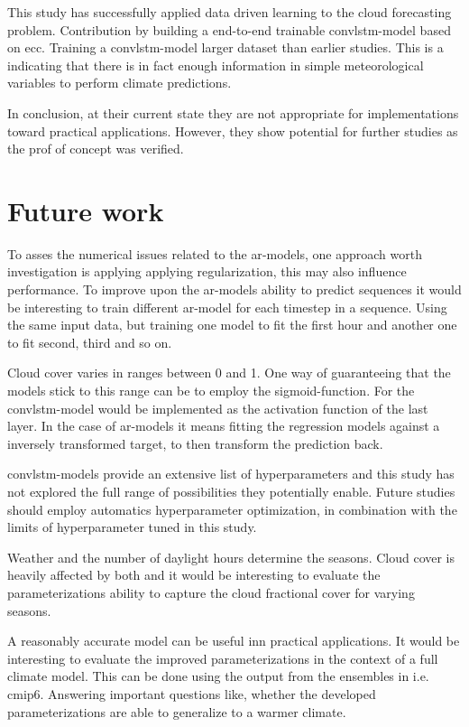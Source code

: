 This study has successfully applied data driven learning to the cloud forecasting problem. Contribution by building a end-to-end trainable \acrshort{convlstm}-model based on \acrshort{ecc}. Training a \acrshort{convlstm}-model larger dataset than earlier studies. This is a indicating that there is in fact enough information in simple meteorological variables to perform climate predictions. 

In conclusion, at their current state they are not appropriate for implementations toward practical applications. However, they show potential for further studies as the prof of concept was verified.

\section{Future work}
To asses the numerical issues related to the \acrshort{ar}-models, one approach worth investigation is applying applying regularization, this may also influence performance. To improve upon the \acrshort{ar}-models ability to predict sequences it would be interesting to train different \acrshort{ar}-model for each timestep in a sequence. Using the same input data, but training one model to fit the first hour and another one to fit second, third and so on.

Cloud cover varies in ranges between 0 and 1. One way of guaranteeing that the models stick to this range can be to employ the sigmoid-function. For the \acrshort{convlstm}-model would be implemented as the activation function of the last layer. In the case of \acrshort{ar}-models it means fitting the regression models against a inversely transformed target, to then transform the prediction back.

\acrshort{convlstm}-models provide an extensive list of hyperparameters and this study has not explored the full range of possibilities they potentially enable. Future studies should employ automatics hyperparameter optimization, in combination with the limits of hyperparameter tuned in this study.  

Weather and the number of daylight hours determine the seasons. Cloud cover is heavily affected by both and it would be interesting to evaluate the parameterizations ability to capture the cloud fractional cover for varying seasons. 

A reasonably accurate model can be useful inn practical applications. It would be interesting to evaluate the improved parameterizations in the context of a full climate model. This can be done using the output from the ensembles in i.e. \acrshort{cmip6}. Answering important questions like, whether the developed parameterizations are able to generalize to a warmer climate.

